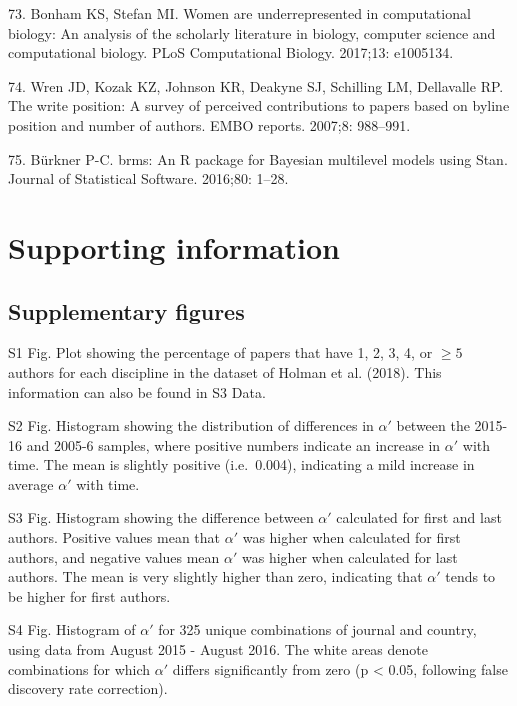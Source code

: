 \documentclass[12pt,]{article}
\begin{document}
\leavevmode\hypertarget{ref-Bonham_2017}{}%
73. Bonham KS, Stefan MI. Women are underrepresented in computational
biology: An analysis of the scholarly literature in biology, computer
science and computational biology. PLoS Computational Biology. 2017;13:
e1005134.

\leavevmode\hypertarget{ref-Wren_2007}{}%
74. Wren JD, Kozak KZ, Johnson KR, Deakyne SJ, Schilling LM, Dellavalle
RP. The write position: A survey of perceived contributions to papers
based on byline position and number of authors. EMBO reports. 2007;8:
988--991.

\leavevmode\hypertarget{ref-burkner_2016}{}%
75. Bürkner P-C. brms: An R package for Bayesian multilevel models using
Stan. Journal of Statistical Software. 2016;80: 1--28.

\newpage

\hypertarget{supporting-information}{%
\section{Supporting information}\label{supporting-information}}

\hypertarget{supplementary-figures}{%
\subsection{Supplementary figures}\label{supplementary-figures}}

S1 Fig. Plot showing the percentage of papers that have 1, 2, 3, 4, or
\({\ge}5\) authors for each discipline in the dataset of Holman et al.
(2018). This information can also be found in S3 Data.

S2 Fig. Histogram showing the distribution of differences in \(\alpha'\)
between the 2015-16 and 2005-6 samples, where positive numbers indicate
an increase in \(\alpha'\) with time. The mean is slightly positive
(i.e.~0.004), indicating a mild increase in average \(\alpha'\) with
time.

S3 Fig. Histogram showing the difference between \(\alpha'\) calculated
for first and last authors. Positive values mean that \(\alpha'\) was
higher when calculated for first authors, and negative values mean
\(\alpha'\) was higher when calculated for last authors. The mean is
very slightly higher than zero, indicating that \(\alpha'\) tends to be
higher for first authors.

S4 Fig. Histogram of \(\alpha'\) for 325 unique combinations of journal
and country, using data from August 2015 - August 2016. The white areas
denote combinations for which \(\alpha'\) differs significantly from
zero (p \textless{} 0.05, following false discovery rate correction).
\end{document}
